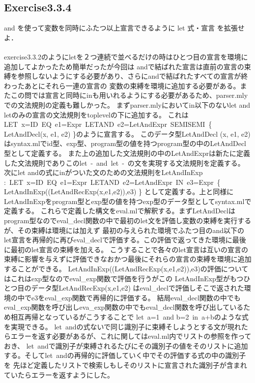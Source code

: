 \documentclass[a4paper,11pt,oneside,openany]{jsarticle}
\begin{document}
\subsection{Exercise3.3.4}
    and を使って変数を同時にふたつ以上宣言できるように let 式・宣言 を拡張せよ．\\\\
    exercise3.3.2のようにletを２つ連続で並べるだけの時はひとつ目の宣言を環境に追加してよかったため簡単だったが今回は
    andで結ばれた宣言は直前の宣言の束縛を参照しないようにする必要があり、さらにandで結ばれたすべての宣言が終わったあとにそれら一連の宣言の
    変数の束縛を環境に追加する必要がある。またこの問では宣言と同時にinも用いれるようにする必要があるため、parser.mlyでの文法規則の定義も難しかった。
    まずparser.mlyにおいてin以下のないlet and letのみの宣言の文法規則をtoplevelの下に追加する。
    これはLET\ x=ID\ EQ\ e1=Expr\ LETAND\ e2=LetAndExpr\ SEMISEMI\ \{ LetAndDecl(x, e1, e2) \}のように宣言する。
    このデータ型LetAndDecl (x, e1, e2)はsyntax.mlでid型、exp型、program型の値を持つprogram型の中のLetAndDecl型として定義する。
    また上の追加した文法規則の中のLetAndExprは新たに定義した文法規則でありこのlet\ -\ and\ let\ -\ の文を実現する文法規則を定義する。
    次にlet andの式にinがついた文のための文法規則をLetAndInExp :\ LET\ x=ID\ EQ\ e1=Expr\ LETAND\ e2=LetAndExpr\ IN\ e3=Expr\ \{ LetAndInExp((LetAndRecExp(x,e1,e2)),e3) \}
    として定義する。上と同様にLetAndInExpをprogram型とexp型の値を持つexp型のデータ型としてsyntax.mlで定義する。
    これらで定義した構文をeval.mlで解釈する。まずLetAndDeclはprogram型なのでeval\_decl関数の中で最初のlet文を評価し変数の束縛を実行するが、その束縛は環境には加えず
    最初の与えられた環境でふたつ目のand以下のlet宣言を再帰的に再びeval\_declで評価する。この評価で返ってきた環境に最後に最初のlet宣言の束縛を加える。
    こうすることで各々のlet宣言は互いの宣言の束縛に影響を与えずに評価できなおかつ最後にそれらの宣言の束縛を環境に追加することができる。
    LetAndInExp((LetAndRecExp(x,e1,e2)),e3)の評価についてはこれはexp型なのでeval\_exp関数で評価を行うがこの LetAndInExp型がもつひとつ目のデータ型LetAndRecExp(x,e1,e2)
    はeval\_declで評価しそこで返された環境の中でe3をeval\_exp関数で再帰的に評価する。
    結局eval\_decl関数の中でもeval\_exp関数を呼び出しeva\_exp関数の中でもeval\_decl関数を呼び出しているため相互再帰となっているがこうすることで
    let\ a=1\ and b=2\ in\ a+bのような式を実現できる。
    let\ andの式ないで同じ識別子に束縛そしようとする文が現れたらエラーを返す必要があるが、これに関してはeval.ml内でリストの参照を作っておき、
    let\ andで識別子が束縛されるたびにその識別子の値をそのリストに追加する。そしてlet\ andの再帰的に評価していく中でその評価する式の中の識別子を
    先ほど定義したリストで検索しもしそのリストに宣言された識別子が含まれていたらエラーを返すようにした。
\end{document}
